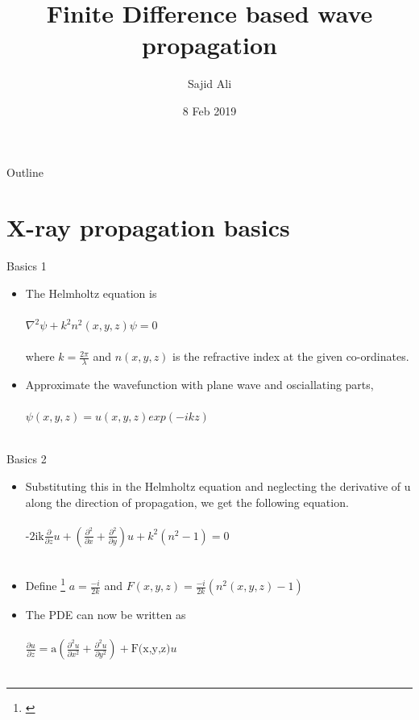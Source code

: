 \documentclass{beamer}
\title{Finite Difference based wave propagation }
\author{Sajid Ali\inst{1}}
\institute[NU] %
{
  \inst{1}%
  Applied Physics\\
  Northwestern Univ}
\date{8 Feb 2019}
\begin{document}
\begin{frame}
  \titlepage
\end{frame}

\begin{frame}{Outline}
  \tableofcontents
\end{frame}


\section{X-ray propagation basics}
\begin{frame}{Basics 1}
\begin{itemize}
	\item The Helmholtz equation is 
	\\~\\
		\qquad $\nabla^{2}\psi+k^{2}n^{2}(x,y,z)\psi=0$
	\\~\\
	where $k=\frac{2\pi}{\lambda}$ and $n(x,y,z)$ is the refractive index at the given co-ordinates.
	\item Approximate the wavefunction with plane wave and osciallating parts,
	\\~\\ 
		\qquad $\psi(x,y,z) = u(x,y,z)exp(-ikz)$
	\\~\\
\end{itemize}
\end{frame}

\begin{frame}{Basics 2}
\begin{itemize}
	\item Substituting this in the Helmholtz equation and neglecting the derivative of u along the direction of propagation, we get the following equation.
	\\~\\
	\qquad	$\mbox{-2ik}\frac{\partial}{\partial z}u+(\frac{\partial ^{2}}{\partial x}+\frac{\partial ^{2}}{\partial y})u + k^{2}(n^{2}-1)=0$ 
	\\~\\
	\item Define \footnote{\cite{Fuhse_thesis}} $a = \frac{-i}{2k}$ and $F(x,y,z) = \frac{-i}{2k}(n^{2}(x,y,z)-1)$
	\item The PDE can now be written as 
	\\~\\
		\qquad $\frac{\partial u}{\partial z} = \mbox{a}(\frac{\partial ^{2}u}{\partial x^{2}}+\frac{\partial^{2}u}{\partial y^{2}}) + \mbox{F(x,y,z)}u$
	\\~\\
\end{itemize}
\end{frame}
\end{document}
